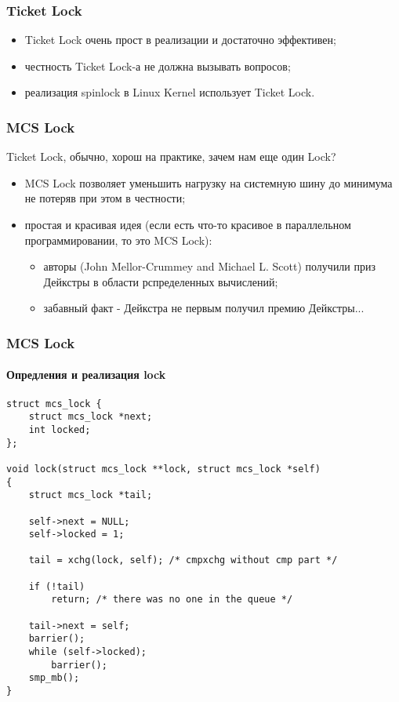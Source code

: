 \begin{frame}
\frametitle{Ticket Lock}

\begin{itemize}
  \item Ticket Lock очень прост в реализации и достаточно эффективен;
  \item честность Ticket Lock-а не должна вызывать вопросов;
  \item реализация spinlock в Linux Kernel использует Ticket Lock.
\end{itemize}
\end{frame}

\begin{frame}
\frametitle{MCS Lock}

Ticket Lock, обычно, хорош на практике, зачем нам еще один Lock?
\begin{itemize}
  \item<1-> MCS Lock позволяет уменьшить нагрузку на системную шину до минимума
        не потеряв при этом в честности;
  \item<2-> простая и красивая идея (если есть что-то красивое в параллельном
        программировании, то это MCS Lock):
        \begin{itemize}
          \item авторы (John Mellor-Crummey and Michael L. Scott) получили приз
                Дейкстры в области рспределенных вычислений;
          \item забавный факт - Дейкстра не первым получил премию Дейкстры...
        \end{itemize}
\end{itemize}
\end{frame}

\begin{frame}[fragile]
\frametitle{MCS Lock}
\framesubtitle{Опредления и реализация lock}
\begin{lstlisting}
struct mcs_lock {
    struct mcs_lock *next;
    int locked;
};

void lock(struct mcs_lock **lock, struct mcs_lock *self)
{
    struct mcs_lock *tail;

    self->next = NULL;
    self->locked = 1;

    tail = xchg(lock, self); /* cmpxchg without cmp part */

    if (!tail)
        return; /* there was no one in the queue */

    tail->next = self;
    barrier();
    while (self->locked);
        barrier();
    smp_mb();
}
\end{lstlisting}
\end{frame}

